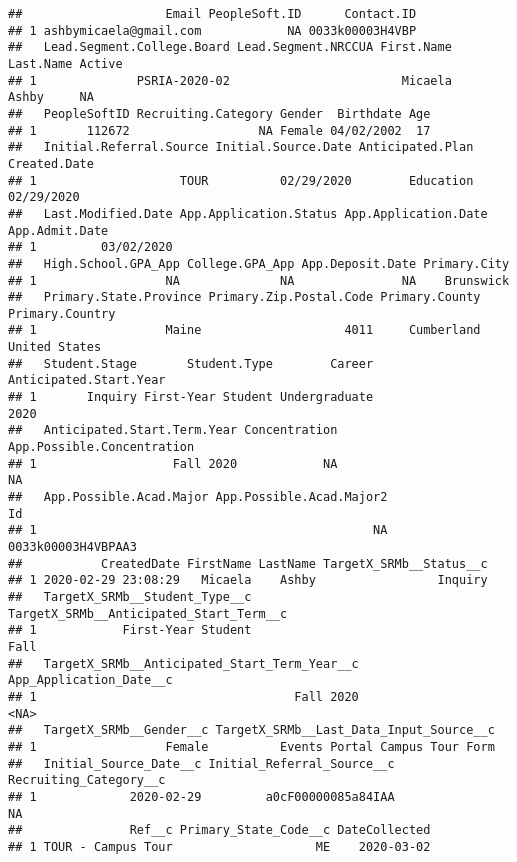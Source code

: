 \documentclass[
]{article}
\begin{document}
\begin{verbatim}
##                    Email PeopleSoft.ID      Contact.ID
## 1 ashbymicaela@gmail.com            NA 0033k00003H4VBP
##   Lead.Segment.College.Board Lead.Segment.NRCCUA First.Name Last.Name Active
## 1              PSRIA-2020-02                        Micaela     Ashby     NA
##   PeopleSoftID Recruiting.Category Gender  Birthdate Age
## 1       112672                  NA Female 04/02/2002  17
##   Initial.Referral.Source Initial.Source.Date Anticipated.Plan Created.Date
## 1                    TOUR          02/29/2020        Education   02/29/2020
##   Last.Modified.Date App.Application.Status App.Application.Date App.Admit.Date
## 1         03/02/2020                                                           
##   High.School.GPA_App College.GPA_App App.Deposit.Date Primary.City
## 1                  NA              NA               NA    Brunswick
##   Primary.State.Province Primary.Zip.Postal.Code Primary.County Primary.Country
## 1                  Maine                    4011     Cumberland   United States
##   Student.Stage       Student.Type        Career Anticipated.Start.Year
## 1       Inquiry First-Year Student Undergraduate                   2020
##   Anticipated.Start.Term.Year Concentration App.Possible.Concentration
## 1                   Fall 2020            NA                         NA
##   App.Possible.Acad.Major App.Possible.Acad.Major2                 Id
## 1                                               NA 0033k00003H4VBPAA3
##           CreatedDate FirstName LastName TargetX_SRMb__Status__c
## 1 2020-02-29 23:08:29   Micaela    Ashby                 Inquiry
##   TargetX_SRMb__Student_Type__c TargetX_SRMb__Anticipated_Start_Term__c
## 1            First-Year Student                                    Fall
##   TargetX_SRMb__Anticipated_Start_Term_Year__c App_Application_Date__c
## 1                                    Fall 2020                    <NA>
##   TargetX_SRMb__Gender__c TargetX_SRMb__Last_Data_Input_Source__c
## 1                  Female          Events Portal Campus Tour Form
##   Initial_Source_Date__c Initial_Referral_Source__c Recruiting_Category__c
## 1             2020-02-29         a0cF00000085a84IAA                     NA
##               Ref__c Primary_State_Code__c DateCollected
## 1 TOUR - Campus Tour                    ME    2020-03-02
\end{verbatim}
\end{document}
